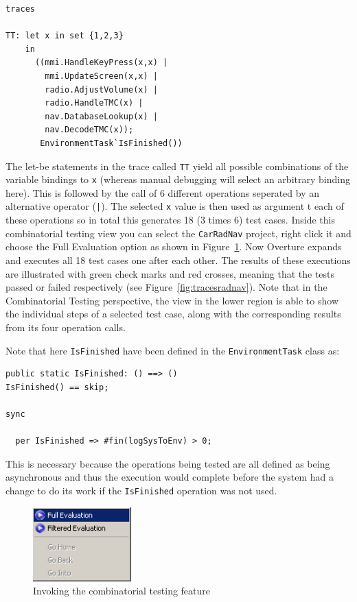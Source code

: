 \begin{lstlisting}
traces

TT: let x in set {1,2,3}
    in
      ((mmi.HandleKeyPress(x,x) | 
        mmi.UpdateScreen(x,x) | 
        radio.AdjustVolume(x) |
        radio.HandleTMC(x) |
        nav.DatabaseLookup(x) |
        nav.DecodeTMC(x));
       EnvironmentTask`IsFinished())
 \end{lstlisting}

\noindent The let-be statements in the trace called
\texttt{TT} yield all possible combinations of the variable
bindings to \texttt{x} (whereas manual debugging will select an
arbitrary binding here). This is followed by the call of 6 different
operations seperated by an alternative operator (\texttt{|}). The
selected \texttt{x} value is then used as argument t each of these
operations so in total this generates 18 (3 times 6) test cases. 
Inside this combinatorial testing view you can
select the \texttt{CarRadNav} project, right click it and 
choose the \textsf{Full
  Evaluation} option as shown in Figure~\ref{fig:CToptions}. 
Now Overture expands
and executes all 18 test cases one after each other. The results of these
executions are illustrated with green check marks and red crosses, meaning that
the tests passed or failed respectively (see Figure~\ref{fig:tracesradnav}). Note
that in the Combinatorial Testing perspective, the view in the lower region is
able to show the individual steps of a selected test case, along with the
corresponding results from its four operation calls.

Note that here \texttt{IsFinished} have been defined in the
\texttt{EnvironmentTask} class as:

\begin{lstlisting}
public static IsFinished: () ==> ()
IsFinished() == skip;

sync

  per IsFinished => #fin(logSysToEnv) > 0;
\end{lstlisting}
This is necessary because the operations being tested are all defined
as being asynchronous and thus the execution would complete before the
system had a change to do its work if the \texttt{IsFinished}
operation was not used.

\begin{figure}[htbp]
\begin{center}
\includegraphics[width=1.5in]{figures/CToptions}
\caption{Invoking the combinatorial testing feature\label{fig:CToptions}}
\end{center}
\end{figure}

